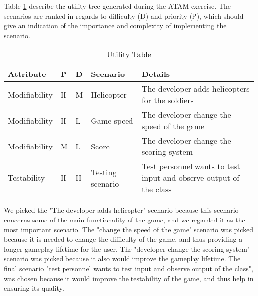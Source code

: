 Table \ref{utilityTable} describe the utility tree generated during the ATAM exercise. The scenarios are ranked in regards to difficulty (D) and priority (P), which should give an indication of the importance and complexity of implementing the scenario.

\begin{table}[h]
  \begin{tabularx}{350pt}{|l | l | l | l| X|}
	\hline	
	\textbf{Attribute} & \textbf{P} & \textbf{D} & \textbf{Scenario} & \textbf{Details}\\
	\hline
	Modifiability & H & M & Helicopter & The developer adds helicopters for the soldiers \\
	\hline
	Modifiability & H & L & Game speed & The developer change the speed of the game \\
	\hline
	Modifiability & M & L & Score & The developer change the scoring system \\
	\hline
	Testability & H & H & Testing scenario & Test personnel wants to test input and observe output of the class \\
	\hline
  \end{tabularx}
  \caption{Utility Table}
  \label{utilityTable}
\end{table}

We picked the "The developer adds helicopter" scenario because this scenario concerns some of the main functionality of the game, and we regarded it as the most important scenario. The "change the speed of the game" scenario was picked because it is needed to change the difficulty of the game, and thus providing a longer gameplay lifetime for the user. The "developer change the scoring system" scenario was picked because it also would improve the gameplay lifetime. The final scenario "test personnel wants to test input and observe output of the class", was chosen because it would improve the testability of the game, and thus help in ensuring its quality.

